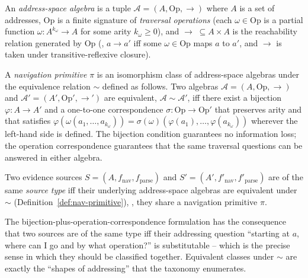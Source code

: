 \begin{definition}
\label{def:addr-algebra}
An \emph{address-space algebra} is a tuple $\mathcal{A} = (A, \mathrm{Op}, \to)$
where $A$ is a set of addresses, $\mathrm{Op}$ is a finite signature of
\emph{traversal operations} (each $\omega \in \mathrm{Op}$ is a partial
function $\omega : A^{k_\omega} \to A$ for some arity $k_\omega \geq 0$),
and $\to \;\subseteq A \times A$ is the reachability relation generated by
$\mathrm{Op}$ (\ie{}, $a \to a'$ iff some $\omega \in \mathrm{Op}$ maps $a$
to $a'$, and $\to$ is taken under transitive-reflexive closure).
\end{definition}

\begin{definition}
\label{def:nav-primitive}
A \emph{navigation primitive} $\pi$ is an isomorphism class of address-space
algebras under the equivalence relation $\sim$ defined as follows. Two
algebras $\mathcal{A} = (A, \mathrm{Op}, \to)$ and $\mathcal{A}' = (A',
\mathrm{Op}', \to')$ are equivalent, $\mathcal{A} \sim \mathcal{A}'$, iff
there exist a bijection $\varphi : A \to A'$ and a one-to-one
correspondence $\sigma : \mathrm{Op} \to \mathrm{Op}'$ that preserves arity
and that satisfies $\varphi(\omega(a_1, \ldots, a_{k_\omega})) =
\sigma(\omega)(\varphi(a_1), \ldots, \varphi(a_{k_\omega}))$ wherever the
left-hand side is defined. The bijection condition guarantees no
information loss; the operation correspondence guarantees that the same
traversal questions can be answered in either algebra.
\end{definition}

\begin{definition}
\label{def:source-type}
Two evidence sources $S = (A, f_{\mathrm{nav}}, f_{\mathrm{parse}})$ and
$S' = (A', f'_{\mathrm{nav}}, f'_{\mathrm{parse}})$ are of the same
\emph{source type} iff their underlying address-space algebras are equivalent
under $\sim$ (Definition~\ref{def:nav-primitive}), \ie{}, they share a
navigation primitive $\pi$.
\end{definition}

The bijection-plus-operation-correspondence formulation has the consequence
that two sources are of the same type iff their addressing question
``starting at $a$, where can I go and by what operation?'' is
substitutable -- which is the precise sense in which they should be
classified together. Equivalent classes under $\sim$ are exactly the
``shapes of addressing'' that the taxonomy enumerates.

